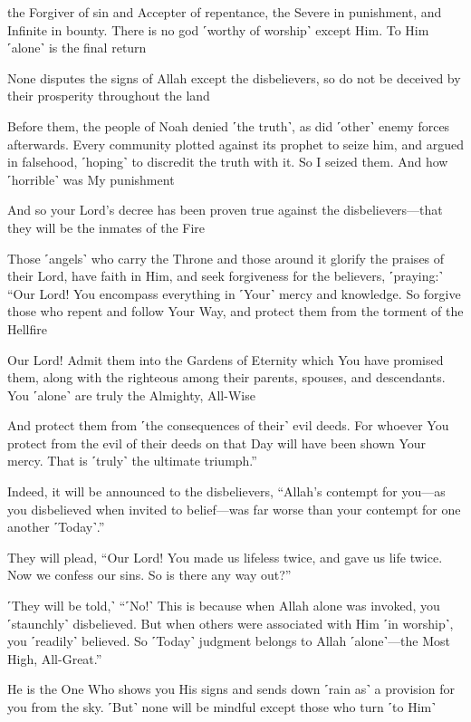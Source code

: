the Forgiver of sin and Accepter of repentance, the Severe in punishment, and Infinite in bounty. There is no god ˹worthy of worship˺ except Him. To Him ˹alone˺ is the final return

None disputes the signs of Allah except the disbelievers, so do not be deceived by their prosperity throughout the land

Before them, the people of Noah denied ˹the truth˺, as did ˹other˺ enemy forces afterwards. Every community plotted against its prophet to seize him, and argued in falsehood, ˹hoping˺ to discredit the truth with it. So I seized them. And how ˹horrible˺ was My punishment

And so your Lord’s decree has been proven true against the disbelievers—that they will be the inmates of the Fire

Those ˹angels˺ who carry the Throne and those around it glorify the praises of their Lord, have faith in Him, and seek forgiveness for the believers, ˹praying:˺ “Our Lord! You encompass everything in ˹Your˺ mercy and knowledge. So forgive those who repent and follow Your Way, and protect them from the torment of the Hellfire

Our Lord! Admit them into the Gardens of Eternity which You have promised them, along with the righteous among their parents, spouses, and descendants. You ˹alone˺ are truly the Almighty, All-Wise

And protect them from ˹the consequences of their˺ evil deeds. For whoever You protect from the evil of their deeds on that Day will have been shown Your mercy. That is ˹truly˺ the ultimate triumph.”

Indeed, it will be announced to the disbelievers, “Allah’s contempt for you—as you disbelieved when invited to belief—was far worse than your contempt for one another ˹Today˺.”

They will plead, “Our Lord! You made us lifeless twice, and gave us life twice. Now we confess our sins. So is there any way out?”

˹They will be told,˺ “˹No!˺ This is because when Allah alone was invoked, you ˹staunchly˺ disbelieved. But when others were associated with Him ˹in worship˺, you ˹readily˺ believed. So ˹Today˺ judgment belongs to Allah ˹alone˺—the Most High, All-Great.”

He is the One Who shows you His signs and sends down ˹rain as˺ a provision for you from the sky. ˹But˺ none will be mindful except those who turn ˹to Him˺

